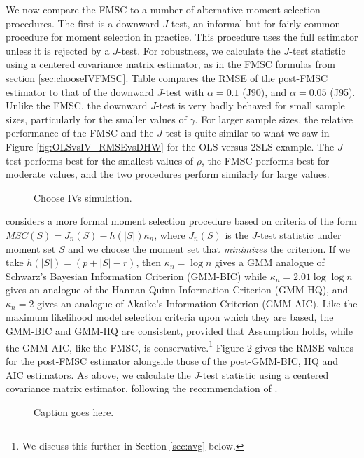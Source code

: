 We now compare the FMSC to a number of alternative moment selection procedures.
The first is a downward $J$-test, an informal but for fairly common procedure for moment selection in practice.
This procedure uses the full estimator unless it is rejected by a $J$-test.
For robustness, we calculate the $J$-test statistic using a centered covariance matrix estimator, as in the FMSC formulas from section \ref{sec:chooseIVFMSC}.
Table \label{fig:chooseIVsim_RMSErelJ} compares the RMSE of the post-FMSC estimator to that of the downward $J$-test with $\alpha = 0.1$ (J90), and $\alpha = 0.05$ (J95).
Unlike the FMSC, the downward $J$-test is very badly behaved for small sample sizes, particularly for the smaller values of $\gamma$.
For larger sample sizes, the relative performance of the FMSC and the $J$-test is quite similar to what we saw in Figure \ref{fig:OLSvsIV_RMSEvsDHW} for the OLS versus 2SLS example.
The $J$-test performs best for the smallest values of $\rho$, the FMSC performs best for moderate values, and the two procedures perform similarly for large values.
\begin{figure}
\centering
	
	\caption{Choose IVs simulation.}
	\label{fig:chooseIVsim_RMSErelJ}
\end{figure}
\cite{Andrews1999} considers a more formal moment selection procedure based on criteria of the form $MSC(S) = J_n(S) - h(|S|)\kappa_n$, where $J_n(S)$ is the $J$-test statistic under moment set $S$ and we choose the moment set that \emph{minimizes} the criterion. 
If we take $h(|S|) = (p + |S| - r)$, then $\kappa_n = \log{n}$ gives a GMM analogue of Schwarz's Bayesian Information Criterion (GMM-BIC) while $\kappa_n = 2.01 \log{\log{n}}$ gives an analogue of the Hannan-Quinn Information Criterion (GMM-HQ), and $\kappa_n = 2$ gives an analogue of Akaike's Information Criterion (GMM-AIC). 
Like the maximum likelihood model selection criteria upon which they are based, the GMM-BIC and GMM-HQ are consistent, provided that Assumption \label{assump:Andrews} holds, while the GMM-AIC, like the FMSC, is conservative.\footnote{We discuss this further in Section \ref{sec:avg} below.} 
Figure \ref{fig:chooseIVsim_RMSErelMSC} gives the RMSE values for the post-FMSC estimator alongside those of the post-GMM-BIC, HQ and AIC estimators.
As above, we calculate the $J$-test statistic using a centered covariance matrix estimator, following the recommendation of \cite{Andrews1999}.
\begin{figure}
\centering
	
	\caption{Caption goes here.}
	\label{fig:chooseIVsim_RMSErelMSC}
\end{figure}


